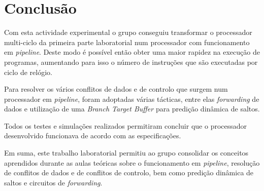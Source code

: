 \documentclass[a4paper]{article}
\begin{document}
	\section{Conclusão}
	
	Com esta actividade experimental o grupo conseguiu transformar o processador multi-ciclo da primeira parte laboratorial num processador com funcionamento em \textit{pipeline}. Deste modo é possível então obter uma maior rapidez na execução de programas, aumentando para isso o número de instruções que são executadas por ciclo de relógio.
	
	Para resolver os vários conflitos de dados e de controlo que surgem num processador em \textit{pipeline}, foram adoptadas várias tácticas, entre elas \textit{forwarding} de dados e utilização de uma \textit{Branch Target Buffer} para predição dinâmica de saltos.
	
	 Todos os testes e simulações realizados permitiram concluir que o processador desenvolvido funcionava de acordo com as especificações.
	 
	  Em suma, este trabalho laboratorial permitiu ao grupo consolidar os conceitos aprendidos durante as aulas teóricas sobre o funcionamento em \textit{pipeline}, resolução de conflitos de dados e de conflitos de controlo, bem como predição dinâmica de saltos e circuitos de \textit{forwarding}.
\end{document}
